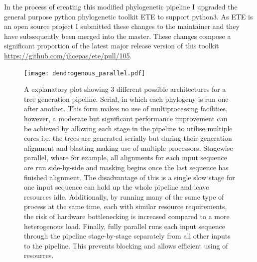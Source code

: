 In the process of creating this modified phylogenetic pipeline I upgraded the general purpose python phylogenetic toolkit
ETE \citep{Huerta-Cepas2010} to support python3.  As ETE is an open source project I submitted these changes
to the maintainer and they have subsequently been merged into the master.  These changes compose a significant proportion of
the latest major release version of this toolkit \url{https://github.com/jhcepas/ete/pull/105}.

\begin{figure}
    \texttt{[image: dendrogenous\_parallel.pdf]}
    \caption{A explanatory plot showing 3 different possible architectures for a tree generation pipeline. 
        Serial, in which each phylogeny is run one after another.  This form makes no use of multiprocessing
        facilities, however, a moderate but significant performance improvement can be achieved by allowing
        each stage in the pipeline to utilise multiple cores i.e. the trees are generated serially but during
        their generation alignment and blasting making use of multiple processors.          
        Stagewise parallel, where for example, all alignments for each input sequence are run side-by-side 
        and masking begins once the last sequence has finished alignment.  The disadvantage of this is a single
        slow stage for one input sequence can hold up the whole pipeline and leave resources idle.  Additionally,
        by running many of the same type of process at the same time, each with similar resource requirements,
        the risk of hardware bottlenecking is increased compared to a more heterogenous load.
        Finally, fully parallel runs each input sequence through the pipeline stage-by-stage separately
    from all other inputs to the pipeline. This prevents blocking and allows efficient using of resources.}
    \label{fig:ddg}
\end{figure}


